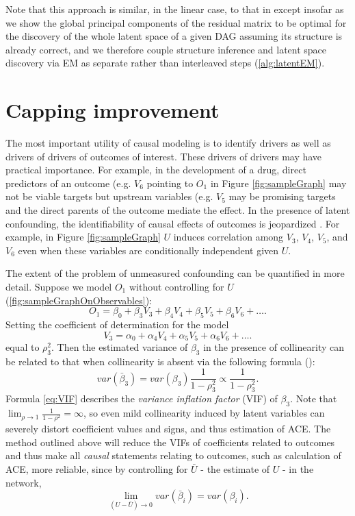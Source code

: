 \documentclass{article}
\begin{document}
Note that this approach is similar, in the linear case, to that in \cite{elidan_ideal_2007} except insofar as we show the global principal components of the residual matrix to be optimal for the discovery of the whole latent space of a given DAG assuming its structure is already correct, and we therefore couple structure inference and latent space discovery via EM as separate rather than interleaved steps (\ref{alg:latentEM}).

\section{Capping improvement}

The most important utility of causal modeling is to identify drivers as well as drivers of drivers of outcomes of interest.  These drivers of drivers may have practical importance. For example, in the development of a drug, direct predictors of an outcome (e.g. $V_6$ pointing to $O_{1}$ in Figure \ref{fig:sampleGraph} may not be viable targets but upstream variables (e.g. $V_{5}$ may be promising targets and the direct parents of the outcome mediate the effect. In the presence of latent confounding, the identifiability of causal effects of outcomes is jeopardized \cite{hernan_estimating_2006}.  For example, in Figure \ref{fig:sampleGraph} $U$ induces correlation among $V_3$, $V_4$, $V_5$, and $V_6$ even when these variables are conditionally independent given $U$.  

The extent of the problem of unmeasured confounding can be quantified in more detail.  Suppose we model $O_1$ without controlling for $U$ (\ref{fig:sampleGraphOnObservables}): $$O_1 = \beta_0 + \beta_3 V_3 + \beta_4 V_4 + \beta_5 V_5 + \beta_6 V_6 + \dots.$$  Setting the coefficient of determination for the model $$V_3 = \alpha_0 + \alpha_4 V_4 + \alpha_5 V_5 + \alpha_6 V_6 + \dots.$$ equal to $\rho_3^2$.  Then the estimated variance of $\beta_3$ in the presence of collinearity can be related to that when collinearity is absent via the following formula (\cite{rawlings_applied_1998}):
\begin{equation}
var(\bar{\beta}_3) = var(\beta_3) \frac{1}{1-\rho_3^2} \propto \frac{1}{1-\rho_3^2}.
\label{eq:VIF}
\end{equation}
Formula \ref{eq:VIF} describes the \textit{variance inflation factor} (VIF) of $\beta_3$.  Note that $\lim_{\rho \to 1} \frac{1}{1-\rho^2} = \infty$, so even mild collinearity induced by latent variables can severely distort coefficient values and signs, and thus estimation of ACE.  The method outlined above will reduce the VIFs of coefficients related to outcomes and thus make all \textit{causal} statements relating to outcomes, such as calculation of ACE, more reliable, since by controlling for $\bar{U}$ - the estimate of $U$ - in the network,
\begin{equation}
\lim_{(U - \bar{U})\to0} var(\bar{\beta}_i) = var(\beta_i).
\label{eq:vifImprovement}
\end{equation}
\end{document}
